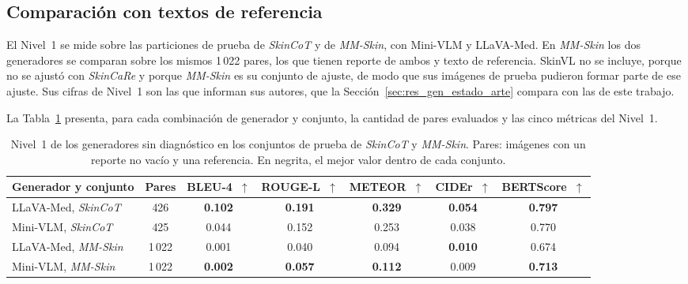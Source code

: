 \subsection{Comparación con textos de referencia}
\label{sec:res_gen_nivel1}

El Nivel~1 se mide sobre las particiones de prueba de \emph{SkinCoT} y de \emph{MM-Skin}, con Mini-VLM y LLaVA-Med.
En \emph{MM-Skin} los dos generadores se comparan sobre los mismos 1\,022 pares, los que tienen reporte de ambos y
texto de referencia. SkinVL no se incluye, porque no se ajustó con \emph{SkinCaRe} y porque \emph{MM-Skin} es su
conjunto de ajuste, de modo que sus imágenes de prueba pudieron formar parte de ese ajuste. Sus cifras de Nivel~1 son
las que informan sus autores, que la Sección~\ref{sec:res_gen_estado_arte} compara con las de este trabajo.

La Tabla~\ref{tab:res_gen_nivel1} presenta, para cada combinación de generador y conjunto, la cantidad de pares
evaluados y las cinco métricas del Nivel~1.

\begin{table}[H]
    \centering
    \caption{Nivel~1 de los generadores sin diagnóstico en los conjuntos de prueba de \emph{SkinCoT} y \emph{MM-Skin}. Pares: imágenes con un reporte no vacío y una referencia. En negrita, el mejor valor dentro de cada conjunto.}
    \label{tab:res_gen_nivel1}
    \small
    \setlength{\tabcolsep}{4pt}
    \begin{tabularx}{\textwidth}{@{}>{\raggedright\arraybackslash}X cccccc@{}}
        \toprule
        \textbf{Generador y conjunto} & \textbf{Pares} & \textbf{BLEU-4}~$\uparrow$ & \textbf{ROUGE-L}~$\uparrow$ & \textbf{METEOR}~$\uparrow$
            & \textbf{CIDEr}~$\uparrow$ & \textbf{BERTScore}~$\uparrow$ \\
        \midrule
        LLaVA-Med, \emph{SkinCoT} & 426 & \textbf{0.102} & \textbf{0.191} & \textbf{0.329} & \textbf{0.054} & \textbf{0.797} \\
        Mini-VLM, \emph{SkinCoT} & 425 & 0.044 & 0.152 & 0.253 & 0.038 & 0.770 \\
        LLaVA-Med, \emph{MM-Skin} & 1\,022 & 0.001 & 0.040 & 0.094 & \textbf{0.010} & 0.674 \\
        Mini-VLM, \emph{MM-Skin} & 1\,022 & \textbf{0.002} & \textbf{0.057} & \textbf{0.112} & 0.009 & \textbf{0.713} \\
        \bottomrule
    \end{tabularx}
\end{table}

